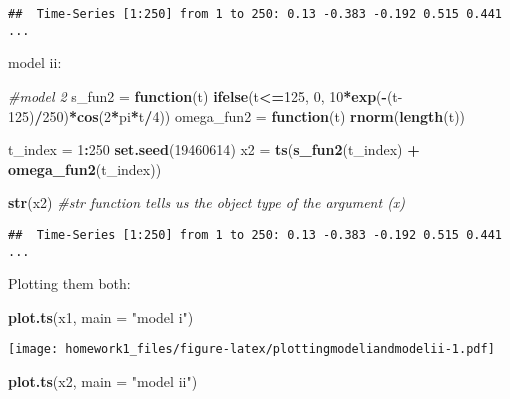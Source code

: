 \documentclass[]{article}
\newenvironment{Shaded}{\begin{snugshade}}{\end{snugshade}}
\newcommand{\CommentTok}[1]{\textcolor[rgb]{0.56,0.35,0.01}{\textit{#1}}}
\newcommand{\ControlFlowTok}[1]{\textcolor[rgb]{0.13,0.29,0.53}{\textbf{#1}}}
\newcommand{\DataTypeTok}[1]{\textcolor[rgb]{0.13,0.29,0.53}{#1}}
\newcommand{\DecValTok}[1]{\textcolor[rgb]{0.00,0.00,0.81}{#1}}
\newcommand{\KeywordTok}[1]{\textcolor[rgb]{0.13,0.29,0.53}{\textbf{#1}}}
\newcommand{\NormalTok}[1]{#1}
\newcommand{\OperatorTok}[1]{\textcolor[rgb]{0.81,0.36,0.00}{\textbf{#1}}}
\newcommand{\StringTok}[1]{\textcolor[rgb]{0.31,0.60,0.02}{#1}}
\begin{document}
\begin{verbatim}
##  Time-Series [1:250] from 1 to 250: 0.13 -0.383 -0.192 0.515 0.441 ...
\end{verbatim}

model ii:

\begin{Shaded}
\begin{Highlighting}[]
\CommentTok{#model 2}
\NormalTok{s_fun2 =}\StringTok{ }\ControlFlowTok{function}\NormalTok{(t) }\KeywordTok{ifelse}\NormalTok{(t}\OperatorTok{<=}\DecValTok{125}\NormalTok{, }\DecValTok{0}\NormalTok{, }\DecValTok{10}\OperatorTok{*}\KeywordTok{exp}\NormalTok{(}\OperatorTok{-}\NormalTok{(t}\DecValTok{-125}\NormalTok{)}\OperatorTok{/}\DecValTok{250}\NormalTok{)}\OperatorTok{*}\KeywordTok{cos}\NormalTok{(}\DecValTok{2}\OperatorTok{*}\NormalTok{pi}\OperatorTok{*}\NormalTok{t}\OperatorTok{/}\DecValTok{4}\NormalTok{))}
\NormalTok{omega_fun2 =}\StringTok{ }\ControlFlowTok{function}\NormalTok{(t) }\KeywordTok{rnorm}\NormalTok{(}\KeywordTok{length}\NormalTok{(t))}

\NormalTok{t_index =}\StringTok{ }\DecValTok{1}\OperatorTok{:}\DecValTok{250}
\KeywordTok{set.seed}\NormalTok{(}\DecValTok{19460614}\NormalTok{)}
\NormalTok{x2 =}\StringTok{ }\KeywordTok{ts}\NormalTok{(}\KeywordTok{s_fun2}\NormalTok{(t_index) }\OperatorTok{+}\StringTok{ }\KeywordTok{omega_fun2}\NormalTok{(t_index))}

\KeywordTok{str}\NormalTok{(x2) }\CommentTok{#str function tells us the object type of the argument (x)}
\end{Highlighting}
\end{Shaded}

\begin{verbatim}
##  Time-Series [1:250] from 1 to 250: 0.13 -0.383 -0.192 0.515 0.441 ...
\end{verbatim}

Plotting them both:

\begin{Shaded}
\begin{Highlighting}[]
\KeywordTok{plot.ts}\NormalTok{(x1, }\DataTypeTok{main =} \StringTok{"model i"}\NormalTok{)}
\end{Highlighting}
\end{Shaded}

\texttt{[image: homework1\_files/figure-latex/plottingmodeliandmodelii-1.pdf]}

\begin{Shaded}
\begin{Highlighting}[]
\KeywordTok{plot.ts}\NormalTok{(x2, }\DataTypeTok{main =} \StringTok{"model ii"}\NormalTok{)}
\end{Highlighting}
\end{Shaded}
\end{document}
